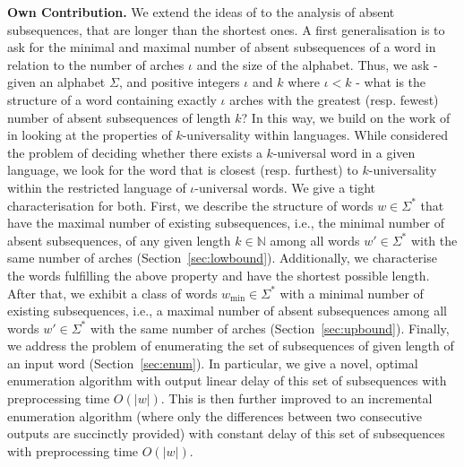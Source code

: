 \documentclass[10pt,a4paper]{amsart}
\newcommand{\N}{\mathbb{N}}
\theoremstyle{plain}
\theoremstyle{definition}
\begin{document}
\noindent
\textbf{Own Contribution.}
We extend the ideas of \cite{DBLP:journals/tcs/FleischmannHHHMN23,DBLP:conf/fct/FleischmannHHN23,DBLP:journals/fuin/KoscheKMS22} to the analysis of absent subsequences, that are longer than the shortest ones. A first generalisation is to ask for the minimal and maximal number of absent subsequences of a word in relation to the number of arches $\iota$ and the size of the alphabet. Thus, we ask - given an alphabet  $\Sigma$, and positive integers $\iota$ and $k$ where $\iota < k$ - what is the structure of a word containing exactly $\iota$ arches with the greatest (resp. fewest) number of absent subsequences of length $k$? In this way, we build on the work of \cite{DBLP:conf/isaac/AdamsonFHKMN23} in looking at the properties of $k$-universality within languages. While \cite{DBLP:conf/isaac/AdamsonFHKMN23} considered the problem of deciding whether there exists a $k$-universal word in a given language, we look for the word that is closest (resp. furthest) to $k$-universality within the restricted language of $\iota$-universal words.
We give a tight characterisation for both. First, we describe the structure of words $w\in\Sigma^*$ that have the maximal number of existing subsequences, i.e., the minimal number of absent subsequences, of any given length $k\in\N$ among all words $w'\in\Sigma^*$ with the same number of arches (Section~\ref{sec:lowbound}). Additionally, we characterise the words fulfilling the above property and have the shortest possible length. After that, we exhibit a class of words $w_{\min}\in\Sigma^*$ with a minimal number of existing subsequences, i.e., a maximal number of absent subsequences among all words $w'\in\Sigma^*$ with the same number of arches (Section~\ref{sec:upbound}). Finally, we address the problem of enumerating the set of subsequences of given length of an input word (Section~\ref{sec:enum}). In particular, we give a novel, optimal enumeration algorithm with output linear delay of this set of subsequences with preprocessing time $O(|w|)$. This is then further improved to an incremental enumeration algorithm (where only the differences between two consecutive outputs are succinctly provided) with constant delay of this set of subsequences with preprocessing time $O(\vert w \vert)$.
%
%
%
\end{document}
